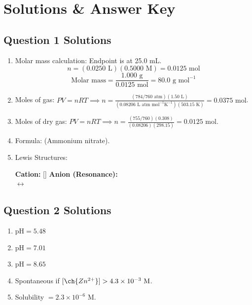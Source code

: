 \documentclass{article}
\begin{document}
\newpage
\section*{Solutions \& Answer Key}

\subsection*{Question 1 Solutions}
\begin{enumerate}[label=\alph*.]
    \item Molar mass calculation: Endpoint is at 25.0 mL.
    \[ n = (0.0250\text{ L})(0.5000\text{ M}) = 0.0125\text{ mol} \]
    \[ \text{Molar mass} = \frac{1.000\text{ g}}{0.0125\text{ mol}} = 80.0\text{ g mol}^{-1} \]
    \item Moles of gas: $PV = nRT \implies n = \frac{(784/760\text{ atm})(1.50\text{ L})}{(0.08206\text{ L atm mol}^{-1}\text{K}^{-1})(503.15\text{ K})} = 0.0375\text{ mol}$.
    \item Moles of dry gas: $PV = nRT \implies n = \frac{(755/760)(0.308)}{(0.08206)(298.15)} = 0.0125\text{ mol}$.
    \item Formula:  (Ammonium nitrate).
    \item Lewis Structures:
    \begin{center}
        \textbf{Cation:} [] \quad
        \textbf{Anion (Resonance):} \\
         \quad $\longleftrightarrow$ \quad {}
    \end{center}
\end{enumerate}

\subsection*{Question 2 Solutions}
\begin{enumerate}[label=\alph*.]
    \item $\text{pH} = 5.48$
    \item $\text{pH} = 7.01$
    \item $\text{pH} = 8.65$
    \item Spontaneous if $[\ch{Zn^{2+}}] > 4.3 \times 10^{-3}\text{ M}$.
    \item Solubility $= 2.3 \times 10^{-6}\text{ M}$.
\end{enumerate}
\end{document}

